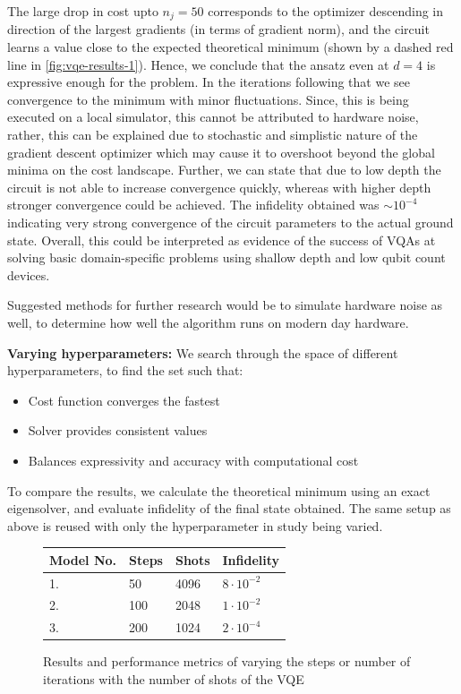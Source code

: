 \documentclass[11pt,a4paper]{article}
\begin{document}
The large drop in cost upto $n_j = 50$ corresponds to the optimizer descending in direction of the largest gradients (in terms of gradient norm), and the circuit learns a value close to the expected theoretical minimum (shown by a dashed red line in \ref{fig:vqe-results-1}). Hence, we conclude that the ansatz even at $d = 4$ is expressive enough for the problem. In the iterations following that we see convergence to the minimum with minor fluctuations. Since, this is being executed on a local simulator, this cannot be attributed to hardware noise, rather, this can be explained due to stochastic and simplistic nature of the gradient descent optimizer which may cause it to overshoot beyond the global minima on the cost landscape. Further, we can state that due to low depth the circuit is not able to increase convergence quickly, whereas with higher depth stronger convergence could be achieved. The infidelity obtained was $\sim 10^{-4}$ indicating very strong convergence of the circuit parameters to the actual ground state. Overall, this could be interpreted as evidence of the success of VQAs at solving basic domain-specific problems using shallow depth and low qubit count devices.

Suggested methods for further research would be to simulate hardware noise as well, to determine how well the algorithm runs on modern day hardware.

\textbf{Varying hyperparameters:} We search through the space of different hyperparameters, to find the set such that:
\begin{itemize}
    \item Cost function converges the fastest
    \item Solver provides consistent values
    \item Balances expressivity and accuracy with computational cost
\end{itemize}

To compare the results, we calculate the theoretical minimum using an exact eigensolver, and evaluate infidelity of the final state obtained. The same setup as above is reused with only the hyperparameter in study being varied.

\begin{figure}[H]
    \centering
    \small
    \begin{tabular}{@{}llll@{}}
        \toprule
        \textbf{Model No.}  & \textbf{Steps} & \textbf{Shots} & \textbf{Infidelity} \\ \midrule
        1. & 50  & 4096 & $8 \cdot 10^{-2}$ \\
        2. & 100 & 2048 & $1 \cdot 10^{-2}$ \\
        3. & 200 & 1024 & $2 \cdot 10^{-4}$ \\ \bottomrule
    \end{tabular}
    \caption{Results and performance metrics of varying the steps or number of iterations with the number of shots of the VQE}
    \label{fig:vqe-vary-1}
\end{figure}
\end{document}
